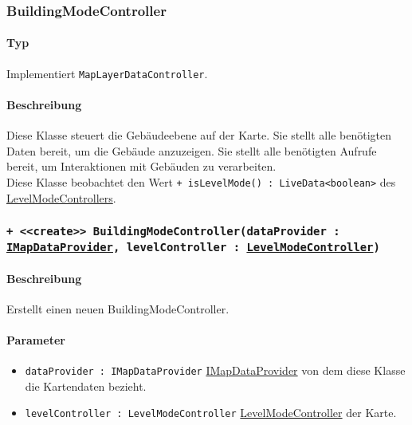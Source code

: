 \subsubsection{BuildingModeController}\label{App_Map_ViewModel_BuildingModeController}
\paragraph*{Typ}
Implementiert \texttt{MapLayerDataController}.
\paragraph*{Beschreibung}
Diese Klasse steuert die Gebäudeebene auf der Karte. Sie stellt alle benötigten Daten bereit, um die Gebäude anzuzeigen. 
Sie stellt alle benötigten Aufrufe bereit, um Interaktionen mit Gebäuden zu verarbeiten.\\
Diese Klasse beobachtet den Wert \texttt{+ isLevelMode() : LiveData<boolean>} des \hyperref[App_Map_ViewModel_LevelModeController]{LevelModeControllers}.

\subsubsection*{\texttt{+ <<create>> BuildingModeController(dataProvider : \hyperref[App_Map_Model_IMapDataProvider]{IMapDataProvider}, levelController : \hyperref[App_Map_ViewModel_LevelModeController]{LevelModeController})}}%
\paragraph*{Beschreibung}
Erstellt einen neuen BuildingModeController.
\paragraph*{Parameter}
\begin{itemize}
    \item \texttt{dataProvider : IMapDataProvider} \hyperref[App_Map_Model_IMapDataProvider]{IMapDataProvider} von dem diese Klasse die Kartendaten bezieht.
    \item \texttt{levelController : LevelModeController} \hyperref[App_Map_ViewModel_LevelModeController]{LevelModeController} der Karte.
\end{itemize}
